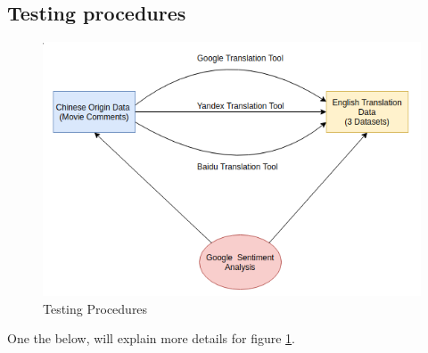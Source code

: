 \documentclass[conference]{IEEEtran}
\begin{document}
\begin{CJK*}{UTF8}{gbsn}
\subsection{Testing procedures} \label{testingModle}
\begin{figure}[h]
  \centering
\includegraphics[width=0.35\paperwidth]{./img/model.png}
\caption{Testing Procedures}
\label{fig:testingProcedures}
\end{figure}
One the below, will explain more details for figure \ref{fig:testingProcedures}.


\end{CJK*}
\end{document}
